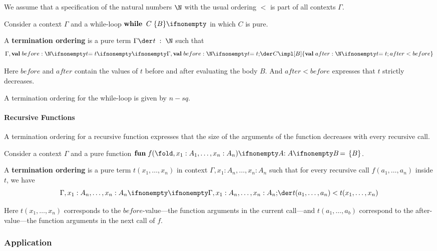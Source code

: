 We assume that a specification of the natural numbers $\N$ with the usual ordering $<$ is part of all contexts $\Gamma$.

\begin{definition}
Consider a context $\Gamma$ and a while-loop $\awhileI{C}{B}$ in which $C$ is pure.

A \textbf{termination ordering} is a pure term $\oftype{}{\Gamma}{t}{\N}$ such that
 \[\iscons{}{\Gamma,\aval{before}{\N}{t}}{}{C\impl \abox{B}{\{\aval{after}{\N}{t}; after<before\}}}\]
\end{definition}

Here $before$ and $after$ contain the values of $t$ before and after evaluating the body $B$.
And $after<before$ expresses that $t$ strictly decreases.

\begin{example}\label{ex:sd:sqrt5}
A termination ordering for the while-loop is given by $n-sq$.
\end{example}

\paragraph{Recursive Functions}

A termination ordering for a recursive function expresses that the size of the arguments of the function decreases with every recursive call.

\begin{definition}
Consider a context $\Gamma$ and a pure function $\afunI[A]{f}{x_1:A_1,\ldots,x_n:A_n}{B}$.

A \textbf{termination ordering} is a pure term $t(x_1,\ldots,x_n)$ in context $\Gamma,x_1:A_n,\ldots,x_n:A_n$ such that for every recursive call $f(a_1,\ldots,a_n)$ inside $t$, we have
 \[\iscons{}{\Gamma,x_1:A_n,\ldots,x_n:A_n}{}{t(a_1,\ldots,a_n)<t(x_1,\ldots,x_n)}\]
\end{definition}

Here $t(x_1,\ldots,x_n)$ corresponds to the $before$-value---the function arguments in the current call---and $t(a_1,\ldots,a_b)$ correspond to the after-value---the function arguments in the next call of $f$.

\subsubsection{Application}

